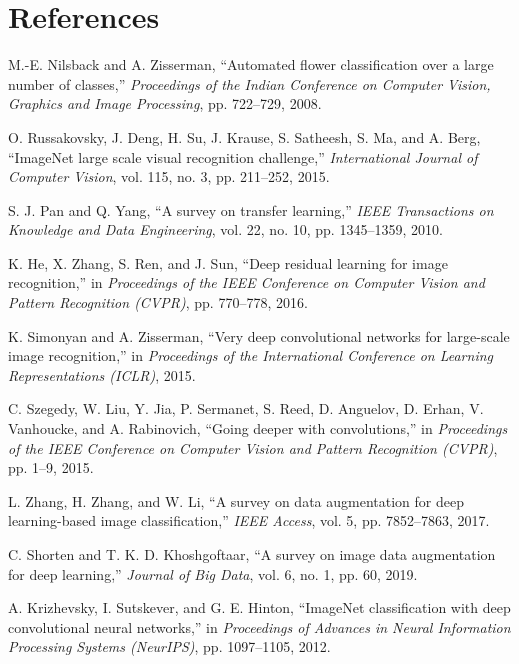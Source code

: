\section*{References}

\begin{thebibliography}{99}

 M.-E. Nilsback and A. Zisserman, ``Automated flower classification over a large number of classes,'' \textit{Proceedings of the Indian Conference on Computer Vision, Graphics and Image Processing}, pp. 722–729, 2008.

 O. Russakovsky, J. Deng, H. Su, J. Krause, S. Satheesh, S. Ma, and A. Berg, ``ImageNet large scale visual recognition challenge,'' \textit{International Journal of Computer Vision}, vol. 115, no. 3, pp. 211–252, 2015.

 S. J. Pan and Q. Yang, ``A survey on transfer learning,'' \textit{IEEE Transactions on Knowledge and Data Engineering}, vol. 22, no. 10, pp. 1345–1359, 2010.

 K. He, X. Zhang, S. Ren, and J. Sun, ``Deep residual learning for image recognition,'' in \textit{Proceedings of the IEEE Conference on Computer Vision and Pattern Recognition (CVPR)}, pp. 770–778, 2016.

 K. Simonyan and A. Zisserman, ``Very deep convolutional networks for large-scale image recognition,'' in \textit{Proceedings of the International Conference on Learning Representations (ICLR)}, 2015.

 C. Szegedy, W. Liu, Y. Jia, P. Sermanet, S. Reed, D. Anguelov, D. Erhan, V. Vanhoucke, and A. Rabinovich, ``Going deeper with convolutions,'' in \textit{Proceedings of the IEEE Conference on Computer Vision and Pattern Recognition (CVPR)}, pp. 1–9, 2015.

 L. Zhang, H. Zhang, and W. Li, ``A survey on data augmentation for deep learning-based image classification,'' \textit{IEEE Access}, vol. 5, pp. 7852–7863, 2017.

 C. Shorten and T. K. D. Khoshgoftaar, ``A survey on image data augmentation for deep learning,'' \textit{Journal of Big Data}, vol. 6, no. 1, pp. 60, 2019.

 A. Krizhevsky, I. Sutskever, and G. E. Hinton, ``ImageNet classification with deep convolutional neural networks,'' in \textit{Proceedings of Advances in Neural Information Processing Systems (NeurIPS)}, pp. 1097–1105, 2012.


\end{thebibliography}
